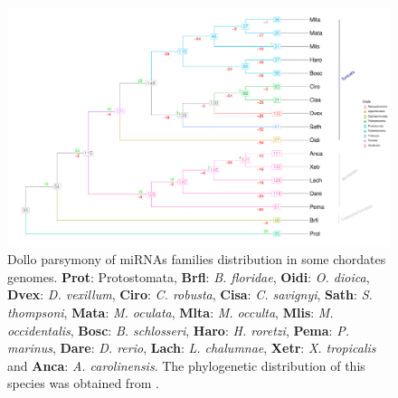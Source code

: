 \documentclass[graybox]{svmult}
\begin{document}
\begin{figure}[t]
\sidecaption[t]
\includegraphics[width=\textwidth]{./Images/last_tree_miRNAs}
\caption{Dollo parsymony of miRNAs families distribution in some 
chordates genomes. \textbf{Prot}: Protostomata, \textbf{Brfl}: \textit{B. floridae},
\textbf{Oidi}: \textit{O. dioica}, \textbf{Dvex}: \textit{D. vexillum},
\textbf{Ciro}: \textit{C. robusta}, \textbf{Cisa}: \textit{C. savignyi}, \textbf{Sath}: \textit{S. thompsoni},
\textbf{Mata}: \textit{M. oculata}, \textbf{Mlta}: \textit{M. occulta},
\textbf{Mlis}: \textit{M. occidentalis}, \textbf{Bosc}: \textit{B. schlosseri},
\textbf{Haro}: \textit{H. roretzi}, \textbf{Pema}: \textit{P. marinus},
\textbf{Dare}: \textit{D. rerio}, \textbf{Lach}: \textit{L. chalumnae},
\textbf{Xetr}: \textit{X. tropicalis} and \textbf{Anca}: \textit{A.
carolinensis}. The phylogenetic distribution of this species was obtained from 
\cite{Delsuc:2017, Kocot:2018}.}
\label{fig:dollotree}
\end{figure}


\end{document}
